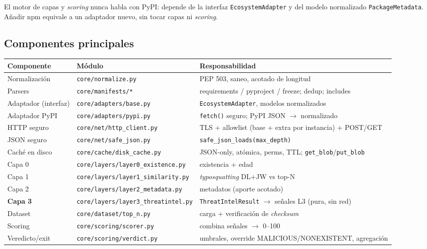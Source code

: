 \documentclass[11pt,a4paper]{article}
\begin{document}
El motor de capas y \emph{scoring} nunca habla con PyPI: depende de la interfaz
\texttt{EcosystemAdapter} y del modelo normalizado \texttt{PackageMetadata}.
Añadir npm equivale a un adaptador nuevo, sin tocar capas ni \emph{scoring}.

\subsection{Componentes principales}
\begin{center}
\small
\begin{tabular}{@{}lll@{}}
\toprule
\textbf{Componente} & \textbf{Módulo} & \textbf{Responsabilidad} \\
\midrule
Normalización & \texttt{core/normalize.py} & PEP 503, saneo, acotado de longitud \\
Parsers & \texttt{core/manifests/*} & requirements / pyproject / freeze; dedup; includes \\
Adaptador (interfaz) & \texttt{core/adapters/base.py} & \texttt{EcosystemAdapter}, modelos normalizados \\
Adaptador PyPI & \texttt{core/adapters/pypi.py} & \texttt{fetch()} seguro; PyPI JSON $\rightarrow$ normalizado \\
HTTP seguro & \texttt{core/net/http_client.py} & TLS + allowlist (base + extra por instancia) + POST/GET \\
JSON seguro & \texttt{core/net/safe_json.py} & \texttt{safe_json_loads(max_depth)} \\
Caché en disco & \texttt{core/cache/disk_cache.py} & JSON-only, atómica, perms, TTL; \texttt{get\_blob}/\texttt{put\_blob} \\
Capa 0 & \texttt{core/layers/layer0\_existence.py} & existencia + edad \\
Capa 1 & \texttt{core/layers/layer1\_similarity.py} & \emph{typosquatting} DL+JW vs top-N \\
Capa 2 & \texttt{core/layers/layer2\_metadata.py} & metadatos (aporte acotado) \\
\textbf{Capa 3} & \texttt{core/layers/layer3\_threatintel.py} & \texttt{ThreatIntelResult} $\rightarrow$ señales L3 (pura, sin red) \\
Dataset & \texttt{core/dataset/top_n.py} & carga + verificación de \emph{checksum} \\
Scoring & \texttt{core/scoring/scorer.py} & combina señales $\rightarrow$ 0--100 \\
Veredicto/exit & \texttt{core/scoring/verdict.py} & umbrales, override MALICIOUS/NONEXISTENT, agregación \\

\end{tabular}
\end{center}
\end{document}
